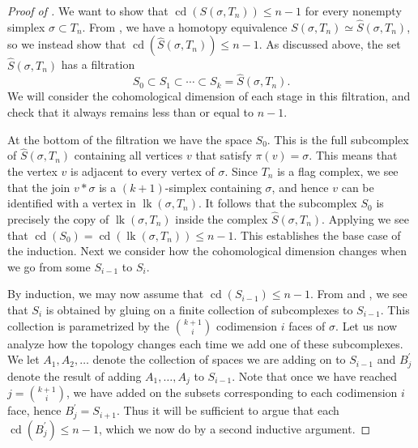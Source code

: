 \documentclass[12pt, letterpaper]{article}
\newcommand{\lk}{\operatorname{lk}}
\newcommand{\cdim}{\operatorname{cd}}
\newcommand{\cd}{\operatorname{cd}}
\theoremstyle{plain}
\theoremstyle{definition}
\begin{document}
\begin{proof}[Proof of ]
We want to show that $\cd(S(\sigma, T_n))\leq n-1$ for every nonempty simplex $\sigma \subset T_n$. From , we have a homotopy equivalence $S(\sigma, T_n) \simeq \hat S(\sigma, T_n)$, so we instead show that $\cd(\hat S(\sigma, T_n))\leq n-1$. As discussed above, the set $\hat S(\sigma, T_n)$ has a filtration
    \[ S_0 \subset S_1 \subset \cdots \subset S_k = \hat S(\sigma, T_n). \]
We will consider the cohomological dimension of each stage in this filtration, and check that it always remains less than or equal to $n-1$.

At the bottom of the filtration we have the space $S_0$. This is the full subcomplex of $\hat S(\sigma, T_n)$ containing all vertices $v$ that satisfy $\pi(v)=\sigma$. This means that the vertex $v$ is adjacent to every vertex of $\sigma$. Since $T_n$ is a flag complex, we see that the join $v*\sigma$ is a $(k+1)$-simplex containing $\sigma$, and hence $v$ can be identified with a vertex in $\lk(\sigma, T_n)$. It follows that the subcomplex $S_0$ is precisely the copy of $\lk(\sigma, T_n)$ inside the complex $\hat S(\sigma, T_n)$. Applying  we see that $\cd(S_0)= \cd(\lk(\sigma, T_n))\leq n-1$. This establishes the base case of the induction. Next we consider how the cohomological dimension changes when we go from some $S_{i-1}$ to $S_{i}$. 

By induction, we may now assume that $\cdim(S_{i-1})\leq n-1$. From  and , we see that $S_{i}$ is obtained by gluing on a finite collection of subcomplexes to $S_{i-1}$. This collection is parametrized by the $\binom{k+1}{i}$ codimension $i$ faces of $\sigma$. Let us now analyze how the topology changes each time we add one of these subcomplexes. We let $A_1, A_2, \ldots $ denote the collection of spaces we are adding on to $S_{i-1}$ and $B_j^\prime$ denote the result of adding $A_1, \ldots , A_j$ to $S_{i-1}$. Note that once we have reached $j={\binom{k+1}{i}}$, we have added on the subsets corresponding to each codimension $i$ face, hence $B_j^\prime=S_{i+1}$. Thus it will be sufficient to argue that each $\cdim(B_j^\prime) \leq n-1$, which we now do by a second inductive argument.


\end{proof}
\end{document}
